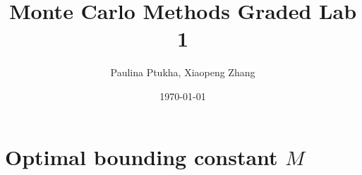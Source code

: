 \documentclass[a4paper, 12pt]{article}
\begin{document}
    \title{Monte Carlo Methods Graded Lab 1}
    \author{Paulina Ptukha, Xiaopeng Zhang}
    \date{\today}



    \section{Optimal bounding constant \(M\)}
    
\end{document}
